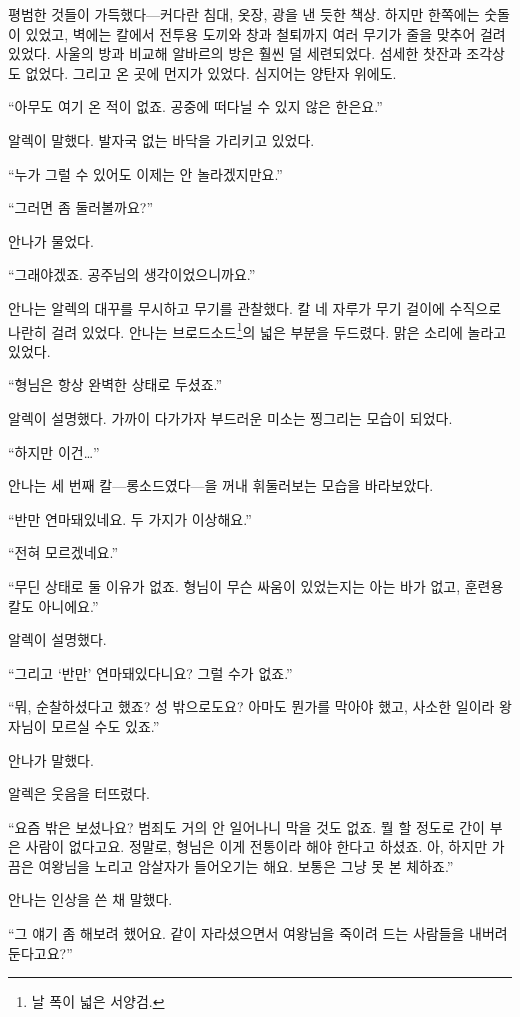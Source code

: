 평범한 것들이 가득했다—커다란 침대, 옷장, 광을 낸 듯한 책상. 하지만 한쪽에는 숫돌이 있었고, 벽에는 칼에서 전투용 도끼와 창과 철퇴까지 여러 무기가 줄을 맞추어 걸려있었다. 사울의 방과 비교해 알바르의 방은 훨씬 덜 세련되었다. 섬세한 찻잔과 조각상도 없었다. 그리고 온 곳에 먼지가 있었다. 심지어는 양탄자 위에도.

``아무도 여기 온 적이 없죠. 공중에 떠다닐 수 있지 않은 한은요.''

알렉이 말했다. 발자국 없는 바닥을 가리키고 있었다.

``누가 그럴 수 있어도 이제는 안 놀라겠지만요.''

``그러면 좀 둘러볼까요?''

안나가 물었다.

``그래야겠죠. 공주님의 생각이었으니까요.''

안나는 알렉의 대꾸를 무시하고 무기를 관찰했다. 칼 네 자루가 무기 걸이에 수직으로 나란히 걸려 있었다. 안나는 브로드소드\footnote{날 폭이 넓은 서양검.}의 넓은 부분을 두드렸다. 맑은 소리에 놀라고 있었다.

``형님은 항상 완벽한 상태로 두셨죠.''

알렉이 설명했다. 가까이 다가가자 부드러운 미소는 찡그리는 모습이 되었다.

``하지만 이건\ldots''

안나는 세 번째 칼—롱소드였다—을 꺼내 휘둘러보는 모습을 바라보았다.

``반만 연마돼있네요. 두 가지가 이상해요.''

``전혀 모르겠네요.''

``무딘 상태로 둘 이유가 없죠. 형님이 무슨 싸움이 있었는지는 아는 바가 없고, 훈련용 칼도 아니에요.''

알렉이 설명했다.

``그리고 `반만' 연마돼있다니요? 그럴 수가 없죠.''

``뭐, 순찰하셨다고 했죠? 성 밖으로도요? 아마도 뭔가를 막아야 했고, 사소한 일이라 왕자님이 모르실 수도 있죠.''

안나가 말했다.

알렉은 웃음을 터뜨렸다.

``요즘 밖은 보셨나요? 범죄도 거의 안 일어나니 막을 것도 없죠. 뭘 할 정도로 간이 부은 사람이 없다고요. 정말로, 형님은 이게 전통이라 해야 한다고 하셨죠. 아, 하지만 가끔은 여왕님을 노리고 암살자가 들어오기는 해요. 보통은 그냥 못 본 체하죠.''

안나는 인상을 쓴 채 말했다.

``그 얘기 좀 해보려 했어요. 같이 자라셨으면서 여왕님을 죽이려 드는 사람들을 내버려 둔다고요?''

